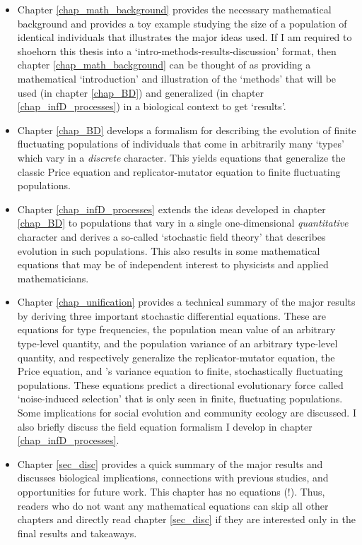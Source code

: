 \begin{itemize}
		\item Chapter \ref{chap_math_background} provides the necessary mathematical background and provides a toy example studying the size of a population of identical individuals that illustrates the major ideas used. If I am required to shoehorn this thesis into a `intro-methods-results-discussion' format, then chapter \ref{chap_math_background} can be thought of as providing a mathematical `introduction' and illustration of the `methods' that will be used (in chapter \ref{chap_BD}) and generalized (in chapter \ref{chap_infD_processes}) in a biological context to get `results'.
		\item Chapter \ref{chap_BD} develops a formalism for describing the evolution of finite fluctuating populations of individuals that come in arbitrarily many `types' which vary in a \emph{discrete} character. This yields equations that generalize the classic Price equation and replicator-mutator equation to finite fluctuating populations.
		\item Chapter \ref{chap_infD_processes} extends the ideas developed in chapter \ref{chap_BD} to populations that vary in a single one-dimensional \emph{quantitative} character and derives a so-called `stochastic field theory' that describes evolution in such populations. This also results in some mathematical equations that may be of independent interest to physicists and applied mathematicians.
		\item Chapter \ref{chap_unification} provides a technical summary of the major results by deriving three important stochastic differential equations. These are equations for type frequencies, the population mean value of an arbitrary type-level quantity, and the population variance of an arbitrary type-level quantity, and respectively generalize the replicator-mutator equation, the Price equation, and \cite{lion_theoretical_2018}'s variance equation to finite, stochastically fluctuating populations. These equations predict a directional evolutionary force called `noise-induced selection' that is only seen in finite, fluctuating populations. Some implications for social evolution and community ecology are discussed. I also briefly discuss the field equation formalism I develop in chapter \ref{chap_infD_processes}.
		\item Chapter \ref{sec_disc} provides a quick summary of the major results and discusses biological implications, connections with previous studies, and opportunities for future work. This chapter has no equations (!). Thus, readers who do not want any mathematical equations can skip all other chapters and directly read chapter \ref{sec_disc} if they are interested only in the final results and takeaways. 
\end{itemize}
